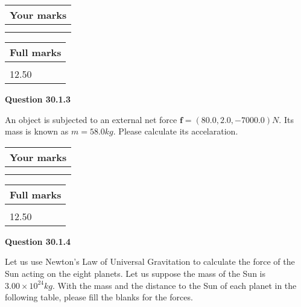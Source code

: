 \documentclass[12pt]{article}
\begin{document}
 
 

 

 
\vspace{0.3in}
  
\vspace{0.2in}
  
         \begin{tabular}{|l|}
\hline
 Your marks  \\
\hline
 \\ 
 \\ 
\hline
\end{tabular}
\hspace{0.05in} \begin{tabular}{|l|}
\hline
 Full marks  \\
\hline
 \\ 
12.50 \\
\hline
\end{tabular}
{\textbf{\Large{Question
30.1.3 
}}}
  
  
 
An object is subjected to an external net force $\mathbf{f}=(
80.0,  %
2.0,
-7000.0  )N$. Its mass is known as
$m= %
58.0 kg$. Please calculate its accelaration.
 
 

 

 
\vspace{0.3in}
  
\vspace{0.2in}
  
         \begin{tabular}{|l|}
\hline
 Your marks  \\
\hline
 \\ 
 \\ 
\hline
\end{tabular}
\hspace{0.05in} \begin{tabular}{|l|}
\hline
 Full marks  \\
\hline
 \\ 
12.50 \\
\hline
\end{tabular}
{\textbf{\Large{Question
30.1.4 
}}}
  
  
Let us use Newton's Law of Universal Gravitation to calculate the force
of the Sun acting on the eight planets. Let us suppose the mass of the
Sun is $ %
3.00 \times 10^{24} kg$. With the mass and the
distance to the Sun of each planet in the following table, please fill
the blanks for the forces.
 
\end{document}
